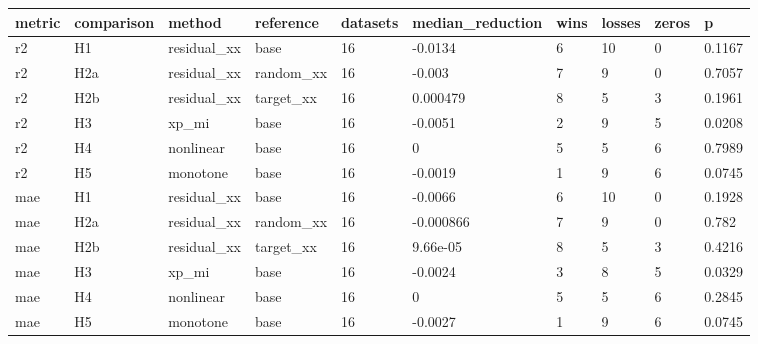 \begin{tabular}{llllllllll}
\toprule
metric & comparison & method & reference & datasets & median\_reduction & wins & losses & zeros & p \\
\midrule
r2 & H1 & residual\_xx & base & 16 & -0.0134 & 6 & 10 & 0 & 0.1167 \\
r2 & H2a & residual\_xx & random\_xx & 16 & -0.003 & 7 & 9 & 0 & 0.7057 \\
r2 & H2b & residual\_xx & target\_xx & 16 & 0.000479 & 8 & 5 & 3 & 0.1961 \\
r2 & H3 & xp\_mi & base & 16 & -0.0051 & 2 & 9 & 5 & 0.0208 \\
r2 & H4 & nonlinear & base & 16 & 0 & 5 & 5 & 6 & 0.7989 \\
r2 & H5 & monotone & base & 16 & -0.0019 & 1 & 9 & 6 & 0.0745 \\
mae & H1 & residual\_xx & base & 16 & -0.0066 & 6 & 10 & 0 & 0.1928 \\
mae & H2a & residual\_xx & random\_xx & 16 & -0.000866 & 7 & 9 & 0 & 0.782 \\
mae & H2b & residual\_xx & target\_xx & 16 & 9.66e-05 & 8 & 5 & 3 & 0.4216 \\
mae & H3 & xp\_mi & base & 16 & -0.0024 & 3 & 8 & 5 & 0.0329 \\
mae & H4 & nonlinear & base & 16 & 0 & 5 & 5 & 6 & 0.2845 \\
mae & H5 & monotone & base & 16 & -0.0027 & 1 & 9 & 6 & 0.0745 \\
\bottomrule
\end{tabular}
